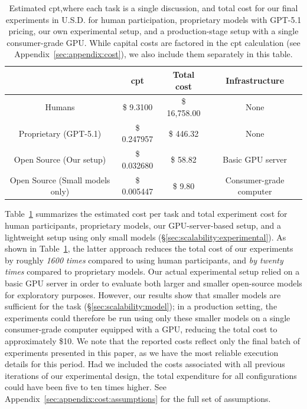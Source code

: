 \begin{table}[ht]
	\centering
	\caption{Estimated \ac{cpt},where each task is a single discussion, and total cost for our final experiments in U.S.D. for human participation, proprietary models with GPT-5.1 pricing, our own experimental setup, and a production-stage setup with a single consumer-grade GPU. While capital costs are factored in the \ac{cpt} calculation (see Appendix~\ref{sec:appendix:cost}), we also include them separately in this table.}
	\label{tab:cost}
	\begin{tabular}{cccc}
		\toprule
		& \ac{cpt} & \textbf{Total cost} & \textbf{Infrastructure} \\
		\midrule
		Humans & \$ 9.3100 & \$ 16{,}758.00 & None \\
		Proprietary (GPT-5.1) & \$ 0.247957 & \$ 446.32 & None \\
		Open Source (Our setup) & \$ 0.032680 & \$ 58.82 & Basic GPU server \\
		Open Source (Small models only) & \$ 0.005447 & \$ 9.80 & Consumer-grade computer \\
		\bottomrule
	\end{tabular}
\end{table}

Table~\ref{tab:cost} summarizes the estimated cost per task and total experiment cost for human participants, proprietary models, our GPU-server-based setup, and a lightweight setup using only small models (\S\ref{sec:scalability:experimental}). As shown in Table~\ref{tab:cost}, the latter approach reduces the total cost of our experiments by roughly \emph{1600 times} compared to using human participants, and \emph{by twenty times} compared to proprietary models. Our actual experimental setup relied on a basic GPU server in order to evaluate both larger and smaller open-source models for exploratory purposes. However, our results show that smaller models are sufficient for the task (\S\ref{sec:scalability:model}); in a production setting, the experiments could therefore be run using only these smaller models on a single consumer-grade computer equipped with a GPU, reducing the total cost to approximately \$10. We note that the reported costs reflect only the final batch of experiments presented in this paper, as we have the most reliable execution details for this period. Had we included the costs associated with all previous iterations of our experimental design, the total expenditure for all configurations could have been five to ten times higher. See Appendix~\ref{sec:appendix:cost:assumptions} for the full set of assumptions.


